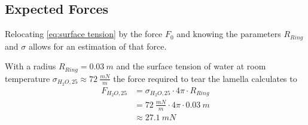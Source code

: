         \subsection{Expected Forces}\label{sec:A10 expected forces}%
        Relocating \cref{eq:surface tension} by the force \(F_0\) and knowing the parameters \(R_{Ring}\) and \(\sigma\) allows
        for an estimation of that force.\par
        With a radius \(R_{Ring} = \SI{0.03}{m}\) and the surface tension of water at room temperature \(\sigma_{H_2O,25} \approx \SI{72}{\frac{mN}{m}}\) \cite{surface.tension.of.pure.water.Pallas.Harrison.1990}
        the force required to tear the lamella calculates to
        \begin{align}
            F_{H_2O,25} &= \sigma_{H_2O,25} \cdot 4\pi \cdot R_{Ring} \nonumber \\
                        &= \SI{72}{\frac{mN}{m}} \cdot 4\pi \cdot \SI{0.03}{m} \nonumber \\
                        &\approx \SI{27.1}{mN}
        \label{eq:calculated force}
        \end{align}

